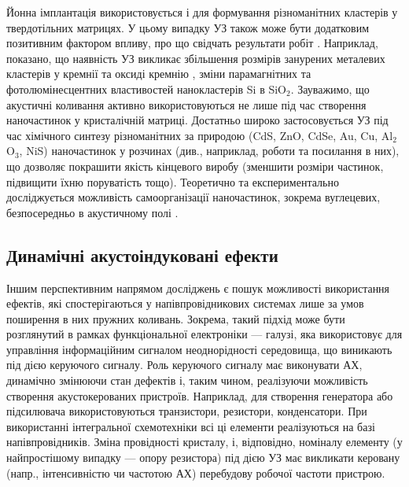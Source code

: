  Йонна імплантація використовується і для формування різноманітних кластерів у твердотільних матрицях.
У цьому випадку УЗ також може бути додатковим позитивним фактором впливу, про що свідчать результати робіт \cite{Roman:2006JAP,Roman:2007APL,Roman:2010JAP,YOlikh2010JL}.
Наприклад, показано, що наявність  УЗ  викликає збільшення розмірів занурених металевих кластерів у кремнії \cite{Roman:2006JAP} та оксиді кремнію \cite{Roman:2007APL}, зміни парамагнітних \cite{Roman:2010JAP} та фотолюмінесцентних \cite{YOlikh2010JL} властивостей нанокластерів Si в SiO$_2$.
Зауважимо, що акустичні коливання активно використовуються не лише під час створення наночастинок у кристалічній матриці.
Достатньо широко застосовується УЗ під час хімічного синтезу різноманітних за природою (CdS, ZnO, CdSe, Au, Cu, Al$_2$O$_3$, NiS) наночастинок у розчинах (див., наприклад, роботи \cite{US:nanoParticle,US:nanoCdSe,US:nanoCu,US:nanoCdS,US:nanoCdSNiS,US:nanoZnOAu} та посилання в них),
що дозволяє покрашити якість кінцевого виробу (зменшити розміри частинок, підвищити їхню поруватість тощо).
Теоретично та експериментально досліджується можливість самоорганізації наночастинок, зокрема вуглецевих, безпосередньо в акустичному полі  \cite{US:nanoAPL2016,PhysRevLett106:076102}.



\subsection{Динамічні акустоіндуковані ефекти}

Іншим перспективним напрямом досліджень є пошук можливості використання
ефектів, які спостерігаються у напівпровідникових системах
лише за умов поширення в них пружних коливань.
Зокрема, такий підхід може бути розглянутий в рамках функціональної електроніки --- галузі,
яка використовує для управління інформаційним сигналом неоднорідності середовища,  що виникають під дією керуючого сигналу.
Роль керуючого сигналу має виконувати АХ, динамічно змінюючи стан дефектів і, таким чином, реалізуючи можливість створення акустокерованих пристроїв.
Наприклад, для створення генератора або підсилювача використовуються транзистори, резистори, конденсатори.
При використанні інтегральної схемотехніки всі ці елементи реалізуються на базі напівпровідників.
Зміна провідності кристалу, і, відповідно, номіналу елементу (у найпростішому випадку --- опору резистора) під дією УЗ
має викликати керовану (напр., інтенсивністю чи частотою АХ) перебудову робочої частоти пристрою.

